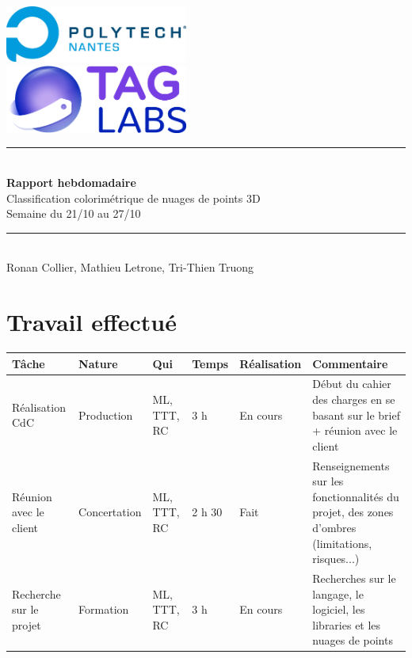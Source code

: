 \documentclass[12pt,titlepage,french]{article}
\begin{document}

\begin{titlepage}
\newcommand{\HRule}{\rule{\linewidth}{0.5mm}}
\center

  \includegraphics[width=0.45\textwidth]{./image2.png}\\[1cm]
   
  \includegraphics[width=0.45\textwidth]{./image1.png}


\HRule \\[0.4cm]
{ \huge \bfseries Rapport hebdomadaire\\[0.15cm] }
Classification colorimétrique de nuages de points 3D\\
Semaine du 21/10 au 27/10
\HRule \\[1.5cm]
Ronan Collier,
Mathieu Letrone,
Tri-Thien Truong
\\[1cm]
\end{titlepage}

\section{Travail effectué}

\noindent\begin{tabularx}{17cm}{|p{2.5cm}|p{2.5cm}|p{1cm}|p{1.5cm}|p{2.5cm}|X|}
    \hline
    \textbf{Tâche} & \textbf{Nature} & \textbf{Qui} & \textbf{Temps} & \textbf{Réalisation} & \textbf{Commentaire} \\
    \hline
    Réalisation CdC & Production & ML, TTT, RC & 3 h & En cours &  Début du cahier des charges en se basant sur le brief + réunion avec le client\\
    \hline
    Réunion avec le client & Concertation & ML, TTT, RC & 2 h 30 & Fait & Renseignements sur les fonctionnalités du projet, des zones d'ombres (limitations, risques...) \\
    \hline
    Recherche sur le projet & Formation & ML, TTT, RC & 3 h & En cours & Recherches sur le langage, le logiciel, les libraries et les nuages de points \\
    \hline
\end{tabularx}
\end{document}
